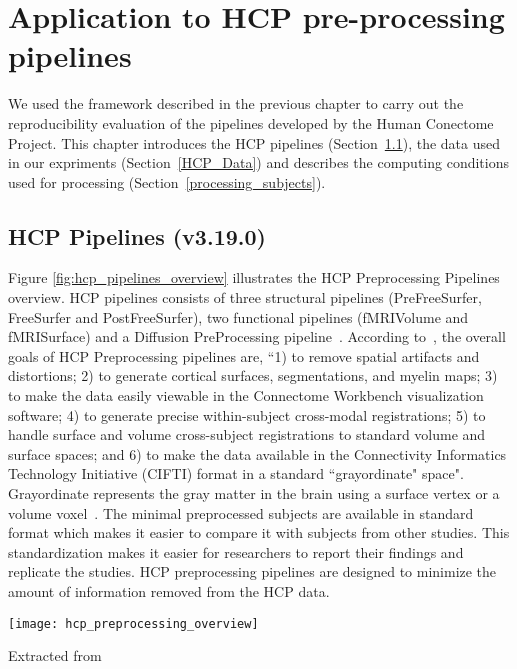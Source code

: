 \chapter{Application to HCP pre-processing pipelines}\label{pipelines}
\setlength{\parskip}{1em}
\setlength{\parindent}{4em}
We used the framework described in the previous chapter to carry out the reproducibility evaluation of the pipelines developed by the Human Conectome Project. This chapter introduces the HCP pipelines (Section~\ref{hcp_pipelines}), the data used in our expriments (Section~\ref{HCP_Data}) and describes the computing conditions used for processing (Section~\ref{processing_subjects}).

\section{HCP Pipelines (v3.19.0)} \label{hcp_pipelines}
Figure \ref{fig:hcp_pipelines_overview} illustrates the HCP Preprocessing Pipelines overview. HCP pipelines consists of three structural pipelines (PreFreeSurfer, FreeSurfer and PostFreeSurfer), two functional pipelines (fMRIVolume and fMRISurface) and a Diffusion PreProcessing pipeline~\cite{Gla13}. According to~\cite{Gla13}, the overall goals of HCP Preprocessing pipelines are, ``1) to remove spatial artifacts and distortions; 2) to generate cortical surfaces, segmentations, and myelin maps; 3) to make the data easily viewable in the Connectome Workbench visualization software; 4) to generate precise within-subject cross-modal registrations; 5) to handle surface and volume cross-subject registrations to standard volume and surface spaces; and 6) to make the data available in the Connectivity Informatics Technology Initiative (CIFTI) format in a standard ``grayordinate" space". Grayordinate represents the gray matter in the brain using a surface vertex or a volume voxel~\cite{Grayordinate}. The minimal preprocessed subjects are available in standard format which makes it easier to compare it with subjects from other studies. This standardization makes it easier for researchers to report their findings and replicate the studies. HCP preprocessing pipelines are designed to minimize the amount of information removed from the HCP data.

\begin{center}
   \texttt{[image: hcp\_preprocessing\_overview]}
   \label{fig:hcp_pipelines_overview}
   \caption*{Extracted from \cite{Gla13}}
\end{center}

